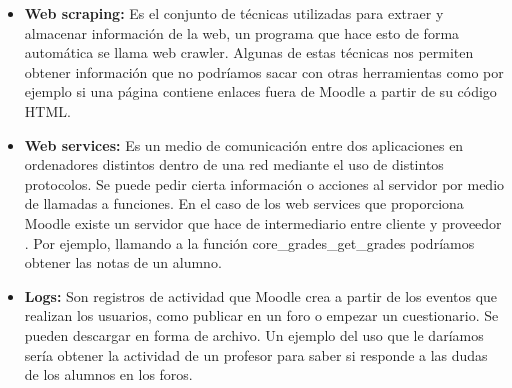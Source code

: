 
\begin{itemize}
	\item \textbf{Web scraping:}
	Es el conjunto de técnicas utilizadas para extraer y almacenar información de la web, un programa que hace esto de forma automática se llama web crawler. Algunas de estas técnicas nos permiten obtener información que no podríamos sacar con otras herramientas como por ejemplo si una página contiene enlaces fuera de Moodle a partir de su código HTML.
	\item \textbf{Web services:}
	Es un medio de comunicación entre dos aplicaciones en ordenadores distintos dentro de una red mediante el uso de distintos protocolos. Se puede pedir cierta información o acciones al servidor por medio de llamadas a funciones. En el caso de los web services que proporciona Moodle existe un servidor que hace de intermediario entre cliente y proveedor \cite{moodle-2020}. Por ejemplo, llamando a la función core\_grades\_get\_grades podríamos obtener las notas de un alumno.
	\item \textbf{Logs:}
	Son registros de actividad que Moodle crea a partir de los eventos que realizan los usuarios, como publicar en un foro o empezar un cuestionario. Se pueden descargar en forma de archivo. Un ejemplo del uso que le daríamos sería obtener la actividad de un profesor para saber si responde a las dudas de los alumnos en los foros.
\end{itemize}


